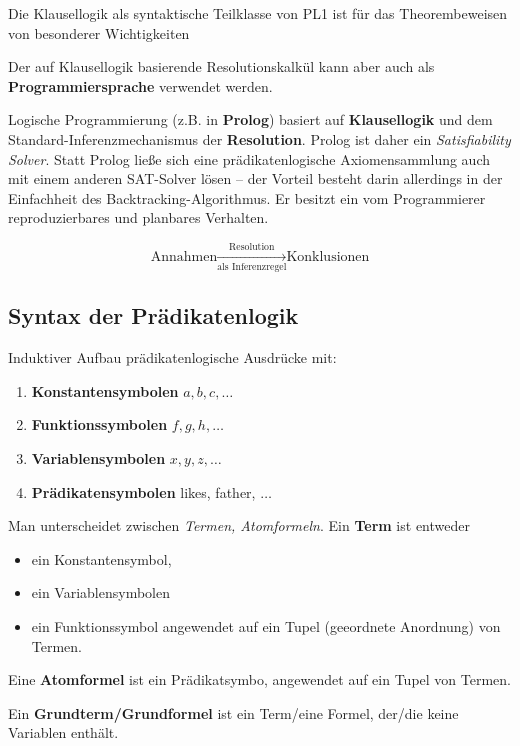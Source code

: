 \documentclass[runningheads,deutsch]{llncs}
\begin{document}
Die Klausellogik als syntaktische Teilklasse von PL1 ist für das Theorembeweisen von besonderer Wichtigkeiten

Der auf Klausellogik basierende Resolutionskalkül kann aber auch als \textbf{Programmiersprache} verwendet werden.

Logische Programmierung (z.B. in \textbf{Prolog}) basiert auf \textbf{Klausellogik} und dem Standard-Inferenzmechanismus der \textbf{Resolution}. Prolog ist daher ein \textit{Satisfiability Solver}. Statt Prolog ließe sich eine prädikatenlogische Axiomensammlung auch mit einem anderen SAT-Solver lösen -- der Vorteil besteht darin allerdings in der Einfachheit des Backtracking-Algorithmus. Er besitzt ein vom Programmierer reproduzierbares und planbares Verhalten. 

\[
    \text{Annahmen} \xrightarrow[\text{als Inferenzregel}]{\text{Resolution}} \text{Konklusionen}
\]


\subsection{Syntax der Prädikatenlogik}

Induktiver Aufbau prädikatenlogische Ausdrücke mit:

\begin{enumerate}
    \item \textbf{Konstantensymbolen} $a, b, c, \dots$
    \item \textbf{Funktionssymbolen} $f, g, h, \dots$
    \item \textbf{Variablensymbolen} $x, y, z, \dots$
    \item \textbf{Prädikatensymbolen} likes, father, $\dots$
\end{enumerate}

Man unterscheidet zwischen \textit{Termen, Atomformeln}.
Ein \textbf{Term} ist entweder

\begin{itemize}
    \item ein Konstantensymbol,
    \item ein Variablensymbolen
    \item ein Funktionssymbol angewendet auf ein Tupel (geeordnete Anordnung) von Termen.
\end{itemize}

Eine \textbf{Atomformel} ist ein Prädikatsymbo, angewendet auf ein Tupel von Termen.

Ein \textbf{Grundterm/Grundformel} ist ein Term/eine Formel, der/die keine Variablen enthält.
\end{document}
